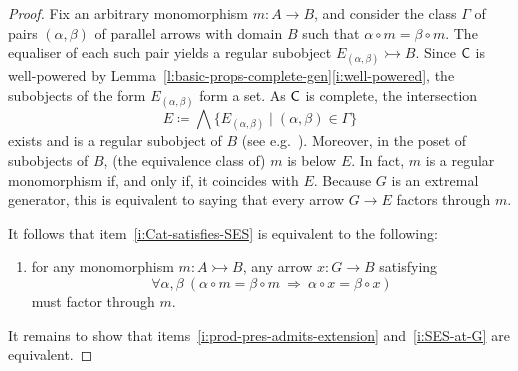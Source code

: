 \documentclass[a4paper,10pt,reqno]{amsart}
\theoremstyle{definition}
\theoremstyle{remark}
\newcommand{\cat}{{\sf C}}								%
\newcommand{\emb}{\rightarrowtail}							%
\begin{document}
\begin{proof}
Fix an arbitrary monomorphism $m\colon A\to B$, and consider the class $\Gamma$ of pairs $(\alpha,\beta)$ of parallel arrows with domain $B$ such that $\alpha\circ m = \beta\circ m$. The equaliser of each such pair yields a regular subobject $E_{(\alpha,\beta)} \emb B$. Since $\cat$ is well-powered by Lemma~\ref{l:basic-props-complete-gen}\ref{i:well-powered}, the subobjects of the form $E_{(\alpha,\beta)}$ form a set. As $\cat$ is complete, the intersection 
\[
E\coloneqq \bigwedge{\{E_{(\alpha,\beta)}\mid (\alpha,\beta)\in\Gamma\}}
\] 
exists and is a regular subobject of $B$ (see e.g.\ \cite[\S 14.5.1]{Schubert1972}). Moreover, in the poset of subobjects of $B$, (the equivalence class of) $m$ is below $E$. In fact, $m$ is a regular monomorphism if, and only if, it coincides with $E$. Because $G$ is an extremal generator, this is equivalent to saying that every arrow $G\to E$ factors through $m$. 

It follows that item~\ref{i:Cat-satisfies-SES} is equivalent to the following:
\begin{enumerate}[label=(\arabic*),resume=implicitops-SES]
\item\label{i:SES-at-G} for any monomorphism $m\colon A\emb B$, any arrow $x\colon G \to B$ satisfying
\[
\forall \alpha,\beta \ (\alpha\circ m = \beta\circ m \ \Rightarrow \ \alpha\circ x = \beta\circ x)
\]
must factor through $m$.
\end{enumerate}
It remains to show that items~\ref{i:prod-pres-admits-extension} and~\ref{i:SES-at-G} are equivalent.



\end{proof}
\end{document}
